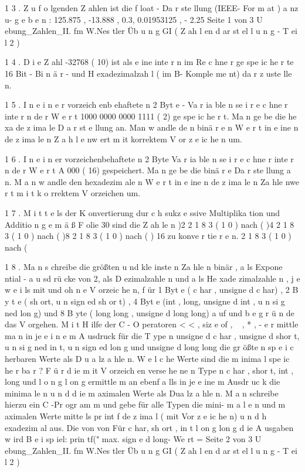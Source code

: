 1 3 . Z u f o lgenden Z ahlen ist die f loat - Da r ste llung (IEEE- For m at ) a nz u-
g e b e n : 125.875 , -13.888 , 0.3, 0.01953125 , - 2.25
Seite 1 von 3
U ebung_Zahlen_II. fm
W.Nes tler
Üb u n g GI ( Z ah l en d ar st el l u n g - T ei l 2 )

1 4 . D i e Z ahl -32768 ( 10) ist als e ine inte r n im Re c hne r ge spe ic he r te 16 Bit -
Bi n ä r - und H exadezimalzah l ( im B- Komple me nt) da r z uste lle n.

1 5 . I n e i n e r vorzeich enb ehaftete n 2 Byt e - Va r ia ble n se i r e c hne r inte r n de r
W e r t 1000 0000 0000 1111 ( 2) ge spe ic he r t. Ma n ge be die he xa de z ima le
D a r st e llung an. Man w andle de n binä r e n W e r t in e ine n de z ima le n
Z a h l e nw ert m it korrektem V or z e ic he n um.

1 6 . I n e i n er vorzeichenbehaftete n 2 Byte Va r ia ble n se i r e c hne r inte r n de r
W e r t A 000 ( 16) gespeichert. Ma n ge be die binä r e Da r ste llung a n.
M a n w andle den hexadezim ale n W e r t in e ine n de z ima le n Za hle nwe r t
m i t k o rrektem V orzeichen um.

1 7 . M i t t e ls der K onvertierung dur c h sukz e ssive Multiplika tion und Additio n
g e m ä ß F olie 30 sind die Z ah le n
)2
2 1 8 3 ( 1 0 ) nach (
)4
2 1 8 3 ( 1 0 ) nach (
)8
2 1 8 3 ( 1 0 ) nach (
) 16 zu konve r tie r e n.
2 1 8 3 ( 1 0 ) nach (

1 8 . Ma n s chreibe die größten u nd kle inste n Za hle n binär , a ls Expone ntial -
a u sd rü cke von 2, als D ezimalzahle n und a ls He xade zimalzahle n ,
j e w e i ls mit und oh n e V orzeic he n, f ür 1 Byt e ( c har , unsigne d c har) ,
2 B y t e ( sh ort, u n sign ed sh or t) , 4 Byt e (int , long, unsigne d int ,
u n si g ned lon g) und 8 B yte ( long long , unsigne d long long) a uf und
b e g r ü n de das V orgehen.
M i t H ilfe der C - O peratoren < < , siz e of , ~ , * , - e r mittle ma n in je
e i n e m A usdruck für die T ype n unsigne d c har , unsigne d shor t,
u n si g ned in t, u n sign ed lon g und unsigne d long long die gr ößte n
sp e i c herbaren Werte als D u a lz a hle n.
W e l c he Werte sind die m inima l spe ic he r ba r ?
F ü r d ie m it V orzeich en verse he ne n Type n c har , shor t, int , long und
l o n g l on g ermittle m an ebenf a lls in je e ine m Ausdr uc k die minima le n
u n d d ie m aximalen Werte als Dua lz a hle n.
M a n schreibe hierzu ein C -Pr ogr am m und gebe für alle Typen die mini-
m a l e n und m aximalen Werte mitte ls pr int f de z ima l ( mit Vor z e ic he n)
u n d h exadezim al aus.
Die
von
von
Für
c har, sh ort , in t %
l on g lon g %
d ie A usgaben w ird %
B e i sp iel: prin tf(" max. sign e d long- We rt = %
Seite 2 von 3
U ebung_Zahlen_II. fm
W.Nes tler
Üb u n g GI ( Z ah l en d ar st el l u n g - T ei l 2 )

